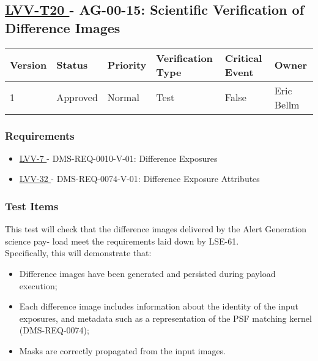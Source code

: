 \subsection{ \href{https://jira.lsstcorp.org/secure/Tests.jspa\#/testCase/LVV-T20}{ LVV-T20 }
             - AG-00-15: Scientific Verification of Difference Images }\label{lvv-t20}





\begin{longtable}[]{llllll}
\toprule
Version & Status & Priority & Verification Type & Critical Event & Owner
\\\midrule
1 & Approved & Normal & Test & False & Eric Bellm
\\\bottomrule
\end{longtable}

\subsubsection{Requirements}

\begin{itemize}

\item \href{https://jira.lsstcorp.org/browse/LVV-7}{ LVV-7 } - DMS-REQ-0010-V-01: Difference Exposures

\item \href{https://jira.lsstcorp.org/browse/LVV-32}{ LVV-32 } - DMS-REQ-0074-V-01: Difference Exposure Attributes

\end{itemize}


\subsubsection{Test Items}

This test will check that the difference images delivered by the Alert
Generation science pay- load meet the requirements laid down by
LSE-61.\\
Specifically, this will demonstrate that:

\begin{itemize}
\tightlist
\item
  Difference images have been generated and persisted during payload
  execution;
\item
  Each difference image includes information about the identity of the
  input exposures, and metadata such as a representation of the PSF
  matching kernel (DMS-REQ-0074);
\item
  Masks are correctly propagated from the input images.
\end{itemize}


